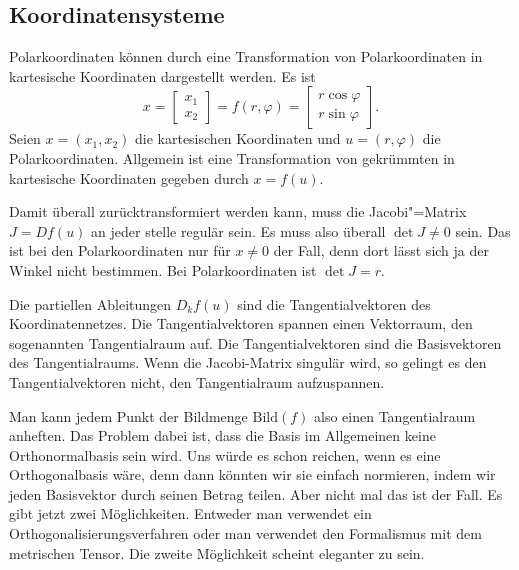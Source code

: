 \documentclass[a4paper,11pt,fleqn,twocolumn,twoside]{scrartcl}
\numberwithin{equation}{section}
\begin{document}
\subsection{Koordinatensysteme}

Polarkoordinaten können durch eine Transformation von
Polarkoordinaten in kartesische Koordinaten dargestellt werden.
Es ist
\begin{equation}
x = \begin{bmatrix}
x_1\\ x_2 \end{bmatrix}
= f(r,\varphi) = \begin{bmatrix}
r\cos\varphi\\
r\sin\varphi
\end{bmatrix}.
\end{equation}
Seien $x=(x_1,x_2)$ die kartesischen Koordinaten und
$u=(r,\varphi)$ die Polarkoordinaten. Allgemein ist eine
Transformation von gekrümmten in kartesische Koordinaten gegeben durch
$x=f(u).$

Damit überall zurücktransformiert werden kann, muss die
Jacobi"=Matrix $J=Df(u)$ an jeder stelle regulär sein. Es muss also
überall $\det J\neq 0$ sein. Das ist bei den Polarkoordinaten nur
für $x\neq 0$ der Fall, denn dort lässt sich ja der Winkel nicht
bestimmen. Bei Polarkoordinaten ist $\det J=r$.

Die partiellen Ableitungen $D_k f(u)$ sind die Tangentialvektoren
des Koordinatennetzes. Die Tangentialvektoren spannen einen
Vektorraum, den sogenannten Tangentialraum auf. Die
Tangentialvektoren sind die Basisvektoren des Tangentialraums.
Wenn die Jacobi-Matrix singulär wird, so gelingt es den
Tangentialvektoren nicht, den Tangentialraum aufzuspannen.

Man kann jedem Punkt der Bildmenge $\mathrm{Bild}(f)$ also einen
Tangentialraum anheften. Das Problem dabei ist, dass die Basis im
Allgemeinen keine Orthonormalbasis sein wird. Uns würde es schon
reichen, wenn es eine Orthogonalbasis wäre, denn dann könnten wir sie
einfach normieren, indem wir jeden Basisvektor durch seinen Betrag
teilen. Aber nicht mal das ist der Fall. Es gibt jetzt zwei
Möglichkeiten. Entweder man verwendet ein Orthogonalisierungsverfahren
oder man verwendet den Formalismus mit dem metrischen Tensor.
Die zweite Möglichkeit scheint eleganter zu sein.
\end{document}
